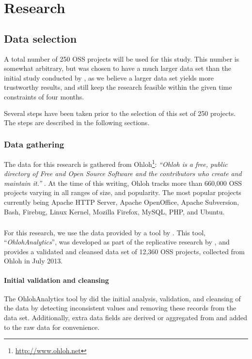 \chapter{Research}
\label{research}

\section{Data selection}
\label{method:data}
A total number of 250 OSS projects will be used for this study. This number is
somewhat arbitrary, but was chosen to have a much larger data set than the
initial study conducted by \citet{karus2013}, as we believe a larger data
set yields more trustworthy results, and still keep the research feasible
within the given time constraints of four months.

Several steps have been taken prior to the selection of this set of 250
projects. The steps are described in the following sections.

\subsection{Data gathering}
The data for this research is gathered from
Ohloh\footnote{\url{http://www.ohloh.net}}: \emph{``Ohloh is a free, public
directory of Free and Open Source Software and the contributors who create and
maintain it.'' }\rm \cite{ohloh}. At the time of this writing, Ohloh tracks more
than 660,000 OSS projects varying in all ranges of size, and popularity. The
most popular projects currently being Apache HTTP Server, Apache OpenOffice,
Apache Subversion, Bash, Firebug, Linux Kernel, Mozilla Firefox, MySQL, PHP,
and Ubuntu.

\paragraph{}
For this research, we use the data provided by a tool by \citet{ohlohanalytics}.
This tool, ``\emph{OhlohAnalytics}\rm'', was developed as part of the
replicative research by \citet{bruntink2014}, and provides a validated and
cleansed data set of 12,360 OSS projects, collected from Ohloh in July 2013.

\subsubsection{Initial validation and cleansing}
The OhlohAnalytics tool by \citet{ohlohanalytics} did the initial analysis,
validation, and cleansing of the data by detecting inconsistent values and
removing these records from the data set. Additionally, extra data fields are
derived or aggregated from and added to the raw data for convenience.

